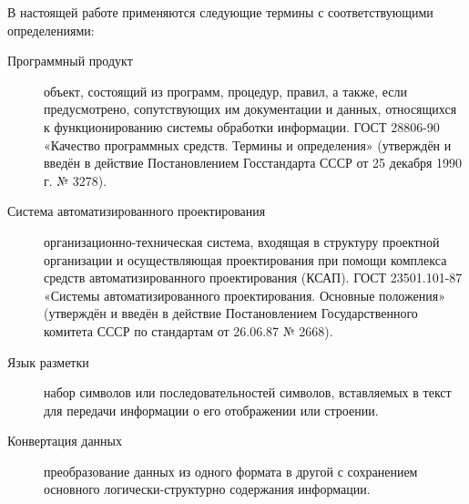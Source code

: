 \Defines %

В настоящей работе применяются следующие термины с соответствующими определениями:

\begin{description}

\item[Программный продукт] объект, состоящий из программ, процедур, правил, а также, если предусмотрено, сопутствующих им документации и данных, относящихся к функционированию системы обработки информации. ГОСТ 28806-90 «Качество программных средств. Термины и определения» (утверждён и введён в действие Постановлением Госстандарта СССР от 25 декабря 1990 г. № 3278).

\item[Система автоматизированного проектирования] организационно-техническая система, входящая в структуру проектной организации и осуществляющая проектирования при помощи комплекса средств автоматизированного проектирования (КСАП). ГОСТ 23501.101-87 «Системы автоматизированного проектирования. Основные положения» (утверждён и введён в действие Постановлением Государственного комитета СССР по стандартам от 26.06.87 № 2668).

\item[Язык разметки] набор символов или последовательностей символов, вставляемых в текст для передачи информации о его отображении или строении.

\item[Конвертация данных] преобразование данных из одного формата в другой с сохранением основного логически-структурно содержания информации.

\end{description}

